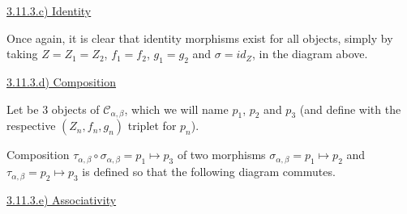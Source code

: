 \documentclass[12pt, letterpaper, twoside]{report}
\begin{document}
\vspace{5mm}
\underline{3.11.3.c) Identity}

Once again, it is clear that identity morphisms exist for all objects, simply by taking $Z = Z_1 = Z_2$, $f_1 = f_2$, $g_1 = g_2$ and $\sigma = id_Z$, in the diagram above.


\vspace{5mm}
\underline{3.11.3.d) Composition}

Let be 3 objects of $\mathcal{C}_{\alpha, \beta}$, which we will name $p_1$, $p_2$ and $p_3$ (and define with the respective $(Z_n, f_n, g_n)$ triplet for $p_n$).

Composition $\tau_{\alpha, \beta} \circ \sigma_{\alpha, \beta} = p_1 \mapsto p_3$ of two morphisms $\sigma_{\alpha, \beta} = p_1 \mapsto p_2$ and $\tau_{\alpha, \beta} = p_2 \mapsto p_3$ is defined so that the following diagram commutes.



\vspace{5mm}
\underline{3.11.3.e) Associativity}
\end{document}
